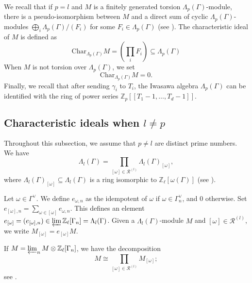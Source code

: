 \documentclass[11pt]{amsart}
\numberwithin{equation}{section}
\theoremstyle{remark}
\newcommand{\?}{\stackrel{?}{=}}
\newcommand{\ZZ}{\mathbb{Z}}
\newcommand{\Zp}{\mathbb{Z}_p}
\newcommand{\Char}{\mathrm{Char}}
\newcommand{\sR}{\mathscr{R}}
\newcommand{\Zl}{\ZZ_\ell}
\begin{document}
We recall that if $p=l$ and $M$ is a finitely generated torsion $\Lambda_p(\Gamma)$-module, there is a pseudo-isomorphism between $M$ and a direct sum of cyclic $\Lambda_p(\Gamma)$-modules $\bigoplus_i \Lambda_p(\Gamma)/(F_i)$ for some $F_i\in\Lambda_p(\Gamma)$ (see \cite[Chapitre VII, no. 4, Théorème 5]{Bourbaki_commutative_algebra}). The characteristic ideal of $M$ is defined as
\[
\Char_{\Lambda_p(\Gamma)}M=\left(\prod_{i}F_i\right)\subseteq\Lambda_p(\Gamma)
\]
When $M$ is not torsion over $\Lambda_p(\Gamma)$, we set $$\Char_{\Lambda_p(\Gamma)}M=0.$$
Finally, we recall that after sending $\gamma_i$ to $T_i$, the Iwasawa algebra $\Lambda_p(\Gamma)$ can be identified with the ring of power series $\Zp[[T_1-1,\dots,T_d-1]]$.
\subsection{Characteristic ideals when $l\ne p$}
Throughout this subsection, we assume that $p\ne l$ are distinct prime numbers. 
 We have 
$$\Lambda_l(\Gamma)=\prod_{[\omega]\in\sR^{(l)}}\Lambda_l(\Gamma)_{[\omega]},$$
where $\Lambda_l(\Gamma)_{[\omega]}\subseteq\Lambda_l(\Gamma)$ is  a ring isomorphic to $\Zl[\omega(\Gamma)]$ (see \cite[Theorem 2.1]{BandiniLonghi}).

Let $\omega\in\Gamma^\vee$.  We define $e_{\omega,n}$ as the idempotent of $\omega$ if $\omega\in\Gamma_n^\vee$, and $0$ otherwise. Set $e_{[\omega],n}=\sum_{\omega\in[\omega]}e_{\omega,n}$. This defines an element $e_{[\omega]}=(e_{[\omega],n})\in \varprojlim \Zl[\Gamma_n]=\Lambda_l(\Gamma)$.
Given a $\Lambda_l(\Gamma)$-module $M$ and $[\omega]\in\sR^{(l)}$, we write $M_{[\omega]}=e_{[\omega]}M$.


If $M=\varprojlim_n M\otimes\Zl[\Gamma_n]$, we have the decomposition
\begin{equation}
\label{eq:decomp-mod}    
M\cong \prod_{[\omega]\in\sR^{(l)}}M_{[\omega]};
\end{equation}
see \cite[(13)]{BandiniLonghi}.
\end{document}
